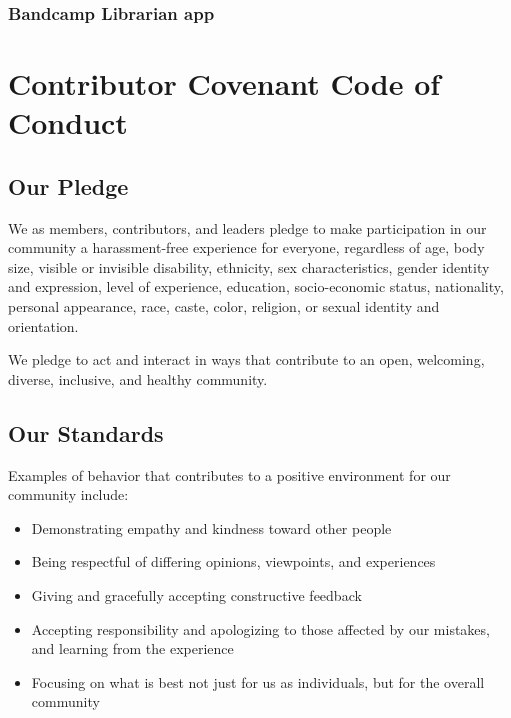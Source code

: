 \documentclass[
  fontsize=13pt,
  english,
  a4paper,
  openany, a4paper, oneside]{article}
\providecommand{\tightlist}{%
  \setlength{\itemsep}{0pt}\setlength{\parskip}{0pt}}
\begin{document}
\hypertarget{bandcamp-librarian-app}{%
\subsubsection{Bandcamp Librarian app}\label{bandcamp-librarian-app}}

\hypertarget{covenant}{%
\section{Contributor Covenant Code of Conduct}\label{covenant}}

\hypertarget{our-pledge}{%
\subsection{Our Pledge}\label{our-pledge}}

We as members, contributors, and leaders pledge to make participation in our
community a harassment-free experience for everyone, regardless of age, body
size, visible or invisible disability, ethnicity, sex characteristics, gender
identity and expression, level of experience, education, socio-economic status,
nationality, personal appearance, race, caste, color, religion, or sexual identity and orientation.

We pledge to act and interact in ways that contribute to an open, welcoming,
diverse, inclusive, and healthy community.

\hypertarget{our-standards}{%
\subsection{Our Standards}\label{our-standards}}

Examples of behavior that contributes to a positive environment for our
community include:

\begin{itemize}
\tightlist
\item
  Demonstrating empathy and kindness toward other people
\item
  Being respectful of differing opinions, viewpoints, and experiences
\item
  Giving and gracefully accepting constructive feedback
\item
  Accepting responsibility and apologizing to those affected by our mistakes,
  and learning from the experience
\item
  Focusing on what is best not just for us as individuals, but for the
  overall community
\end{itemize}
\end{document}
